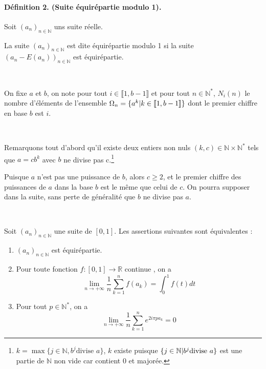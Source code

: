 \paragraph{D{\'e}finition 2. (Suite {\'e}quir{\'e}partie modulo 1).}

Soit $(a_n)_{n \in \mathbb{N}}$ uns suite r{\'e}elle.

La suite $(a_n)_{n \in \mathbb{N}}$ est dite {\'e}quir{\'e}partie modulo 1 si
la suite $(a_n - E (a_n))_{n \in \mathbb{N}}$ est {\'e}quir{\'e}partie.

\

On fixe $a$ et $b$, on note pour tout $i \in \llbracket 1, b - 1 \rrbracket $
et pour tout $n \in \mathbb{N}^{\ast}$, $N_i (n)$ le nombre d'{\'e}l{\'e}ments
de l'ensemble $\Omega_n =\{a^k  |  k \in \llbracket 1, b - 1
\rrbracket \}$ dont le premier chiffre en base $b$ est $i$.

\

Remarquons tout d'abord qu'il existe deux entiers non nuls $(k, c) \in
\mathbb{N} \times \mathbb{N}^{\ast}$ tels que $a = cb^k$ avec $b$ ne divise
pas c.\footnote{$k = \max \{j \in \mathbb{N}, b^j  \text{divise } a\}$, $k$
existe puisque $\{j \in \mathbb{N} |  b^j  \text{divise } a\}$ est
une partie de $\mathbb{N}$ non vide car contient 0 et major{\'e}e.}

Puisque $a$ n'est pas une puissance de $b$, alors $c \geq 2$, et le premier
chiffre des puissances de $a$ dans la base $b$ est le m{\^e}me que celui de
$c$. On pourra supposer dans la suite, sans perte de g{\'e}n{\'e}ralit{\'e}
que $b$ ne divise pas $a$.

\


Soit $(a_n)_{n \in \mathbb{N}}$ une suite de $[0, 1]$. Les assertions
suivantes sont {\'e}quivalentes :
\begin{enumerate}
  \item $(a_n)_{n \in \mathbb{N}}$ est {\'e}quir{\'e}partie.
  
  \item Pour toute fonction $f : [0, 1] \to \mathbb{R}$ continue , on a
  \[ \underset{n \to + \infty}{\lim}  \frac{1}{n}  \underset{k =
     1}{\overset{n}{\sum}} f (a_k) = \int_0^1 f (t) dt \]
  \item Pour tout $p \in \mathbb{N}^{\ast}$, on a
  \[ \underset{n \to + \infty}{\lim}   \frac{1}{n}  \sum_{k = 1}^n e^{2 i \pi
     pa_k} = 0 \]
\end{enumerate}


